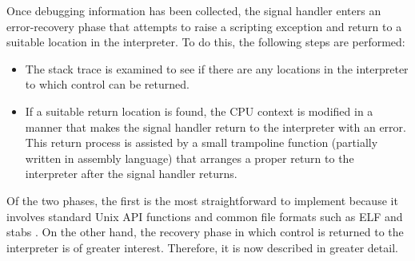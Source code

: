 Once debugging information has been collected, the signal handler
enters an error-recovery phase that
attempts to raise a scripting exception and return to a suitable location in the 
interpreter.  To do this, the following steps are performed:

\begin{itemize}

\item The stack trace is examined to see if there are any locations in the interpreter
to which control can be returned. 

\item If a suitable return location is found, the CPU context is modified in
a manner that makes the signal handler return to the interpreter
with an error.  This return process is assisted by a small
trampoline function (partially written in assembly language) that arranges a proper
return to the interpreter after the signal handler returns.
\end{itemize}

\noindent
Of the two phases, the first is the most straightforward to implement
because it involves standard Unix API functions and common file formats such
as ELF and stabs \cite{elf,stabs}.   On the other hand, the recovery phase in
which control is returned to the interpreter is of greater interest.  Therefore, 
it is now described in greater detail.

